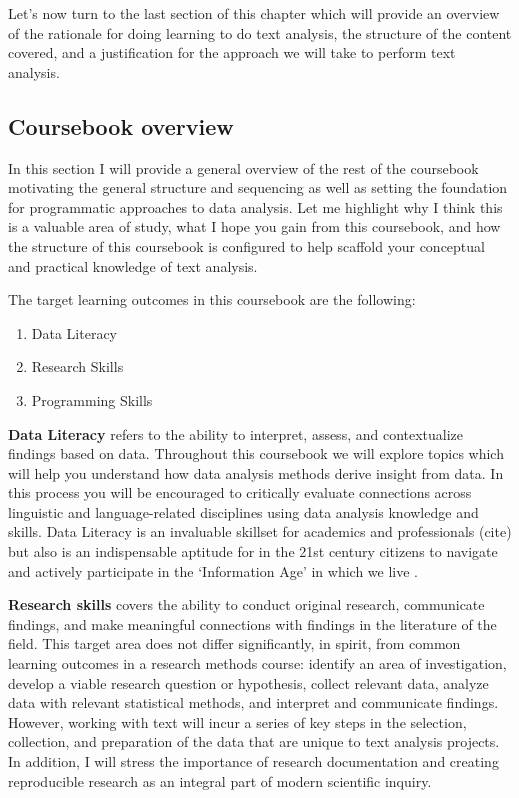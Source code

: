 \documentclass[
]{article}
\providecommand{\tightlist}{%
  \setlength{\itemsep}{0pt}\setlength{\parskip}{0pt}}
\begin{document}
Let's now turn to the last section of this chapter which will provide an overview of the rationale for doing learning to do text analysis, the structure of the content covered, and a justification for the approach we will take to perform text analysis.

\hypertarget{coursebook-overview}{%
\subsection{Coursebook overview}\label{coursebook-overview}}

In this section I will provide a general overview of the rest of the coursebook motivating the general structure and sequencing as well as setting the foundation for programmatic approaches to data analysis. Let me highlight why I think this is a valuable area of study, what I hope you gain from this coursebook, and how the structure of this coursebook is configured to help scaffold your conceptual and practical knowledge of text analysis.

The target learning outcomes in this coursebook are the following:

\begin{enumerate}
\def\labelenumi{\arabic{enumi}.}
\tightlist
\item
  Data Literacy
\item
  Research Skills
\item
  Programming Skills
\end{enumerate}

\textbf{Data Literacy} refers to the ability to interpret, assess, and contextualize findings based on data. Throughout this coursebook we will explore topics which will help you understand how data analysis methods derive insight from data. In this process you will be encouraged to critically evaluate connections across linguistic and language-related disciplines using data analysis knowledge and skills. Data Literacy is an invaluable skillset for academics and professionals (cite) but also is an indispensable aptitude for in the 21st century citizens to navigate and actively participate in the `Information Age' in which we live \citep{Carmi2020}.

\textbf{Research skills} covers the ability to conduct original research, communicate findings, and make meaningful connections with findings in the literature of the field. This target area does not differ significantly, in spirit, from common learning outcomes in a research methods course: identify an area of investigation, develop a viable research question or hypothesis, collect relevant data, analyze data with relevant statistical methods, and interpret and communicate findings. However, working with text will incur a series of key steps in the selection, collection, and preparation of the data that are unique to text analysis projects. In addition, I will stress the importance of research documentation and creating reproducible research as an integral part of modern scientific inquiry.
\end{document}
